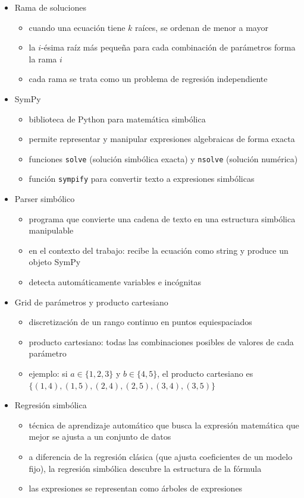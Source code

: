 \documentclass{article}
\begin{document}
\begin{itemize}[leftmargin=1.5em]
  \item Rama de soluciones
  \begin{itemize}
\item cuando una ecuación tiene $k$ raíces, se ordenan de menor a mayor \item la $i$-ésima raíz más pequeña para cada combinación de parámetros forma la rama $i$ \item cada rama se trata como un problema de regresión independiente
  \end{itemize}

  \item SymPy
  \begin{itemize}
\item biblioteca de Python para matemática simbólica \item permite representar y manipular expresiones algebraicas de forma exacta \item funciones \texttt{solve} (solución simbólica exacta) y \texttt{nsolve} (solución numérica) \item función \texttt{sympify} para convertir texto a expresiones simbólicas
  \end{itemize}

  \item Parser simbólico
  \begin{itemize}
\item programa que convierte una cadena de texto en una estructura simbólica manipulable \item en el contexto del trabajo: recibe la ecuación como string y produce un objeto SymPy \item detecta automáticamente variables e incógnitas
  \end{itemize}

  \item Grid de parámetros y producto cartesiano
  \begin{itemize}
\item discretización de un rango continuo en puntos equiespaciados \item producto cartesiano: todas las combinaciones posibles de valores de cada parámetro \item ejemplo: si $a \in \{1,2,3\}$ y $b \in \{4,5\}$, el producto cartesiano es $\{(1,4),(1,5),(2,4),(2,5),(3,4),(3,5)\}$
  \end{itemize}

  \item Regresión simbólica
  \begin{itemize}
\item técnica de aprendizaje automático que busca la expresión matemática que mejor se ajusta a un conjunto de datos \item a diferencia de la regresión clásica (que ajusta coeficientes de un modelo fijo), la regresión simbólica descubre la estructura de la fórmula \item las expresiones se representan como árboles de expresiones
  \end{itemize}


\end{itemize}
\end{document}
